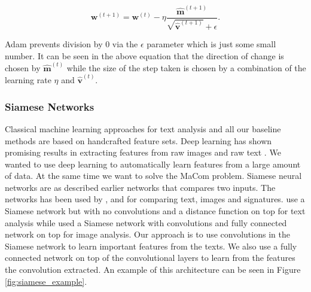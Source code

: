 \begin{description}
        \begin{equation}
            \mathbf{w}^{(t + 1)} = \mathbf{w}^{(t)} -
                \eta\frac
                    {\mathbf{\hat{m}}^{(t+1)}}
                    {\sqrt{\mathbf{\hat{v}}^{(t+1)}} + \epsilon}.
        \end{equation}

        \gls{Adam} prevents division by 0 via the $\epsilon$ parameter which is
        just some small number. It can be seen in the above equation that the
        direction of change is chosen by $\mathbf{\hat{m}}^{(t)}$ while the size
        of the step taken is chosen by a combination of the learning rate $\eta$
        and $\mathbf{\hat{v}}^{(t)}$.

\end{description}


\subsubsection{Siamese Networks}\label{subsubsec:siamese_networks}

Classical machine learning approaches for text analysis and all our baseline
methods are based on handcrafted feature sets. Deep learning has shown
promising results in extracting features from raw images and raw text
\citep{hongxiaosunyuan}. We wanted to use deep learning to automatically learn
features from a large amount of data. At the same time we want to solve the
MaCom problem. Siamese neural networks are as described earlier networks that
compares two inputs. The networks has been used by \citet{Koch2015SiameseNN},
\citet{NIPS1993_769} and \citet{qian:2018} for comparing text, images and
signatures. \citet{qian:2018} use a Siamese network but with no convolutions and
a distance function on top for text analysis while \citet{Koch2015SiameseNN}
used a Siamese network with convolutions and fully connected network on top
for image analysis. Our approach is to use convolutions in the Siamese network
to learn important features from the texts. We also use a fully connected
network on top of the convolutional layers to learn from the features the
convolution extracted. An example of this architecture can be seen in Figure
\ref{fig:siamese_example}.

